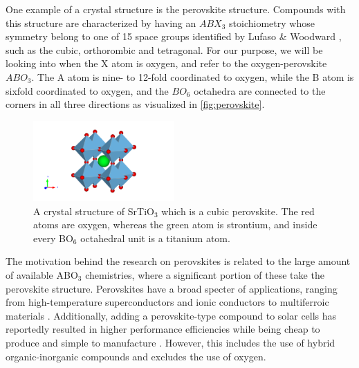 One example of a crystal structure is the perovskite structure. Compounds with this structure are characterized by having an $ABX_3$ stoichiometry whose symmetry belong to one of 15 space groups identified by Lufaso \& Woodward \cite{Lufaso2001}, such as the cubic, orthorombic and tetragonal. For our purpose, we will be looking into when the X atom is oxygen, and refer to the oxygen-perovskite $ABO_3$. The A atom is nine- to 12-fold coordinated to oxygen, while the B atom is sixfold coordinated to oxygen, and the $BO_6$ octahedra are connected to the corners in all three directions as visualized in \autoref{fig:perovskite}.

\begin{figure}
  \centering
  \includegraphics[width=0.48\textwidth]{theory/figures/SrTiO3_mp-5229_primitive.pdf}
  \caption{A crystal structure of SrTiO$_3$ which is a cubic perovskite. The red atoms are oxygen, whereas the green atom is strontium, and inside every BO$_6$ octahedral unit is a titanium atom.}
  \label{fig:perovskite}
\end{figure}

The motivation behind the research on perovskites is related to the large amount of available ABO$_3$ chemistries, where a significant portion of these take the perovskite structure. Perovskites have a broad specter of applications, ranging from high-temperature superconductors \cite{Bednorz1988} and ionic conductors \cite{Boivin1998} to multiferroic materials \cite{Cheong2007}. Additionally, adding a perovskite-type compound to solar cells has reportedly resulted in higher performance efficiencies while being cheap to produce and simple to manufacture \cite{IbnMohammed2017, Chen2014}. However, this includes the use of hybrid organic-inorganic compounds and excludes the use of oxygen.


